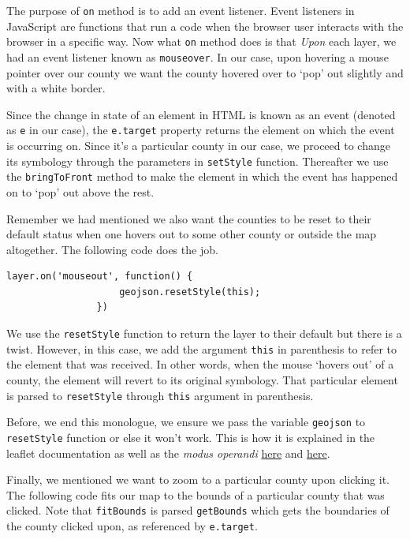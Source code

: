 \documentclass[
]{book}
\begin{document}
The purpose of \texttt{on} method is to add an event listener. Event listeners in JavaScript are functions that run a code when the browser user interacts with the browser in a specific way. Now what \texttt{on} method does is that \emph{Upon} each layer, we had an event listener known as \texttt{mouseover}. In our case, upon hovering a mouse pointer over our county we want the county hovered over to `pop' out slightly and with a white border.

Since the change in state of an element in HTML is known as an event (denoted as \texttt{e} in our case), the \texttt{e.target} property returns the element on which the event is occurring on. Since it's a particular county in our case, we proceed to change its symbology through the parameters in \texttt{setStyle} function. Thereafter we use the \texttt{bringToFront} method to make the element in which the event has happened on to `pop' out above the rest.

Remember we had mentioned we also want the counties to be reset to their default status when one hovers out to some other county or outside the map altogether. The following code does the job.

\begin{verbatim}
layer.on('mouseout', function() {
                    geojson.resetStyle(this);
                })
\end{verbatim}

We use the \texttt{resetStyle} function to return the layer to their default but there is a twist. However, in this case, we add the argument \texttt{this} in parenthesis to refer to the element that was received. In other words, when the mouse `hovers out' of a county, the element will revert to its original symbology. That particular element is parsed to \texttt{resetStyle} through \texttt{this} argument in parenthesis.

Before, we end this monologue, we ensure we pass the variable \texttt{geojson} to \texttt{resetStyle} function or else it won't work. This is how it is explained in the leaflet documentation as well as the \emph{modus operandi} \href{https://stackoverflow.com/questions/35072630/why-doesnt-resetstyle-of-leaflet-work-for-me}{here} and \href{https://stackoverflow.com/questions/21029533/reset-style-on-leaflet-polygon-on-click}{here}.

Finally, we mentioned we want to zoom to a particular county upon clicking it. The following code fits our map to the bounds of a particular county that was clicked. Note that \texttt{fitBounds} is parsed \texttt{getBounds} which gets the boundaries of the county clicked upon, as referenced by \texttt{e.target}.
\end{document}
